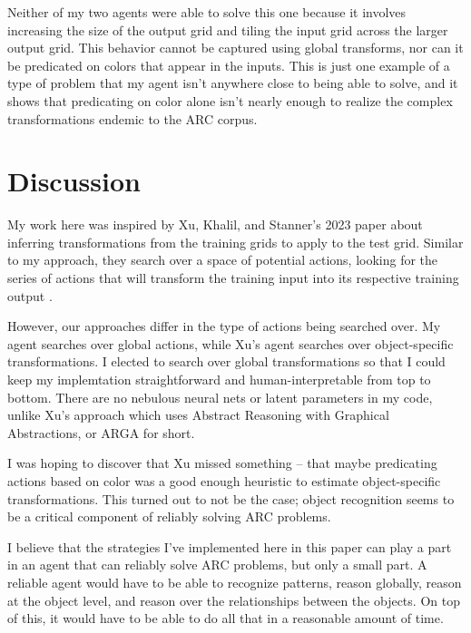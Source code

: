 \documentclass[letterpaper]{article} %
\begin{document}
Neither of my two agents were able to solve this one because it involves increasing the size of the output grid and tiling the input grid across the larger output grid. This behavior cannot be captured using global transforms, nor can it be predicated on colors that appear in the inputs. This is just one example of a type of problem that my agent isn't anywhere close to being able to solve, and it shows that predicating on color alone isn't nearly enough to realize the complex transformations endemic to the ARC corpus.

\section{Discussion}
My work here was inspired by Xu, Khalil, and Stanner's 2023 paper about inferring transformations from the training grids to apply to the test grid. Similar to my approach, they search over a space of potential actions, looking for the series of actions that will transform the training input into its respective training output \cite{Xu_Khalil_Sanner_2023}.

\bigskip

However, our approaches differ in the type of actions being searched over. My agent searches over global actions, while Xu's agent searches over object-specific transformations. I elected to search over global transformations so that I could keep my implemtation straightforward and human-interpretable from top to bottom. There are no nebulous neural nets or latent parameters in my code, unlike Xu's approach which uses Abstract Reasoning with Graphical Abstractions, or ARGA for short.

\bigskip

I was hoping to discover that Xu missed something -- that maybe predicating actions based on color was a good enough heuristic to estimate object-specific transformations. This turned out to not be the case; object recognition seems to be a critical component of reliably solving ARC problems.

\bigskip

I believe that the strategies I've implemented here in this paper can play a part in an agent that can reliably solve ARC problems, but only a small part. A reliable agent would have to be able to recognize patterns, reason globally, reason at the object level, and reason over the relationships between the objects. On top of this, it would have to be able to do all that in a reasonable amount of time.




\end{document}
